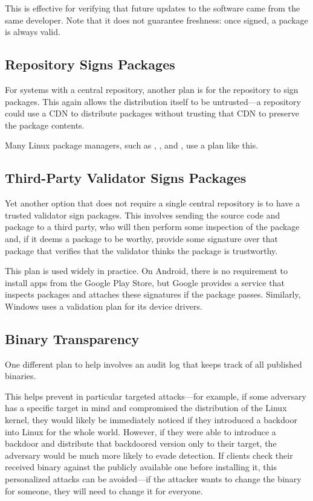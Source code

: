This is effective for verifying that future updates to the software came from the same developer. Note that it does not guarantee freshness: once signed, a package is always valid.

\subsection{Repository Signs Packages}
For systems with a central repository, another plan is for the repository to sign packages. This again allows the distribution itself to be untrusted---a repository could use a CDN to distribute packages without trusting that CDN to preserve the package contents.

Many Linux package managers, such as , , and , use a plan like this.

\subsection{Third-Party Validator Signs Packages}
Yet another option that does not require a single central repository is to have a trusted validator sign packages. This involves sending the source code and package to a third party, who will then perform some inspection of the package and, if it deems a package to be worthy, provide some signature over that package that verifies that the validator thinks the package is trustworthy.

This plan is used widely in practice. On Android, there is no requirement to install apps from the Google Play Store, but Google provides a service that inspects packages and attaches these signatures if the package passes. Similarly, Windows uses a validation plan for its device drivers. 

\subsection{Binary Transparency}
One different plan to help involves an audit log that keeps track of all published binaries.

This helps prevent in particular targeted attacks---for example, if some adversary has a specific target in mind and compromised the distribution of the Linux kernel, they would likely be immediately noticed if they introduced a backdoor into Linux for the whole world. However, if they were able to introduce a backdoor and distribute that backdoored version only to their target, the adversary would be much more likely to evade detection. If clients check their received binary against the publicly available one before installing it, this personalized attacks can be avoided---if the attacker wants to change the binary for someone, they will need to change it for everyone.

